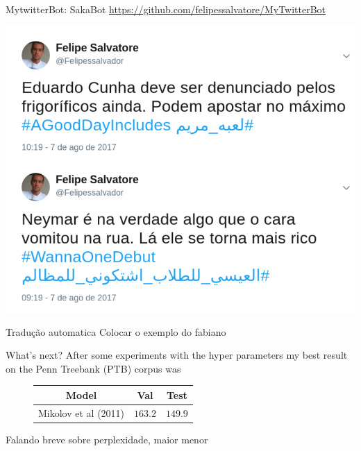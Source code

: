\documentclass[10pt]{beamer}
\begin{document}
\begin{frame}{MytwitterBot: SakaBot}
\url{https://github.com/felipessalvatore/MyTwitterBot}
\begin{center}
\includegraphics[scale=0.24]{images/SakaBot.png}
\end{center}
\end{frame}


\begin{frame}{Tradução automatica}
Colocar o exemplo do fabiano
\end{frame}


\begin{frame}{What's next?}
After some experiments with the hyper parameters my best result on the \alert{Penn Treebank (PTB)} corpus was

\vspace{0.5cm}

\begin{figure}
\begin{center}
\begin{tabular}{|c|c|c|}
\hline
\cellcolor{blue!60}Model & \cellcolor{blue!60}Val & \cellcolor{blue!60}Test  \\ \hline
Mikolov et al (2011)\cite{Mikolov11} & $163.2$  & $149.9$ \\ \hline
\end{tabular}
\end{center}
\end{figure}

Falando breve sobre perplexidade, maior menor
\end{frame}
\end{document}
